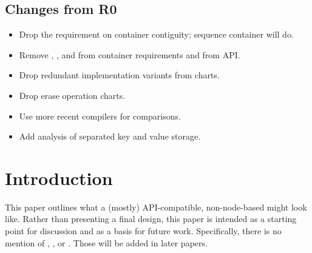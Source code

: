 \documentclass{article}
\begin{document}
\subsection{Changes from R0}

\begin{itemize}
  \item Drop the requirement on container contiguity; sequence container will
    do.
  \item Remove , , and 
    from container requirements and from  API.
  \item Drop redundant implementation variants from charts.
  \item Drop erase operation charts.
  \item Use more recent compilers for comparisons.
  \item Add analysis of separated key and value storage.
\end{itemize}

\section{Introduction}

\label{sec:intro}

This paper outlines what a (mostly) API-compatible, non-node-based 
might look like.  Rather than presenting a final design, this paper is
intended as a starting point for discussion and as a basis for future work.
Specifically, there is no mention of , , or
.  Those will be added in later papers.



\end{document}
